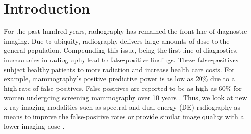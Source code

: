 \documentclass[a4paper,11pt]{article}
\begin{document}

\section{Introduction}

For the past hundred years, radiography has remained the front line of diagnostic imaging. Due to ubiquity, radiography delivers large amounts of dose to the general population. Compounding this issue, being the first-line of diagnostics, inaccuracies in radiography lead to false-positive findings. These false-positives subject healthy patients to more radiation and increase health care costs. For example, mammography's positive predictive power is as low as 20\% \cite{Skaane2013ProspectiveArbitration., Dickersin2010TheCancer, Kopans1992TheMammography., Mushlin1998EstimatingMeta-analysis, Chiarelli2013DigitalProgram} due to a high rate of false positives. False-positives are reported to be as high as 60\% for women undergoing screening mammography over 10 years \cite{Kerlikowske2013OutcomesTherapy, Hubbard2011CumulativeMammography}. Thus, we look at new x-ray imaging modalities such as spectral and dual energy (DE) radiography as means to improve the false-positive rates or provide similar image quality with a lower imaging dose .

\end{document}
